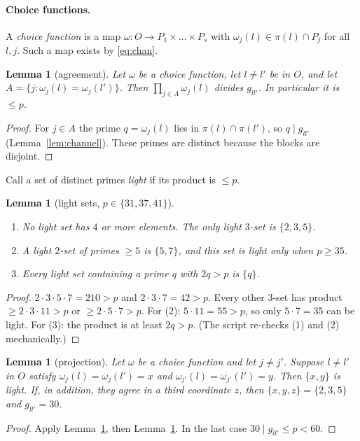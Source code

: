 \documentclass[11pt]{article}
\newtheorem{lemma}[theorem]{Lemma}
\theoremstyle{definition}
\theoremstyle{remark}
\begin{document}
\paragraph{Choice functions.} A \emph{choice function} is a map $\omega:O\to P_1\times\dots\times P_s$
with $\omega_j(l)\in\pi(l)\cap P_j$ for all $l,j$. Such a map exists by \eqref{eq:chan}.

\begin{lemma}[agreement]\label{lem:agree}
Let $\omega$ be a choice function, let $l\ne l'$ be in $O$, and let $A=\{j:\omega_j(l)=\omega_j(l')\}$.
Then $\prod_{j\in A}\omega_j(l)$ divides $g_{ll'}$. In particular it is $\le p$.
\end{lemma}
\begin{proof}
For $j\in A$ the prime $q=\omega_j(l)$ lies in $\pi(l)\cap\pi(l')$, so $q\mid g_{ll'}$
(Lemma~\ref{lem:channel}). These primes are distinct because the blocks are disjoint.
\end{proof}

Call a set of distinct primes \emph{light} if its product is $\le p$.

\begin{lemma}[light sets, $p\in\{31,37,41\}$]\label{lem:light}
\begin{enumerate}
\item No light set has $4$ or more elements. The only light $3$-set is $\{2,3,5\}$.
\item A light $2$-set of primes $\ge5$ is $\{5,7\}$, and this set is light only when $p\ge35$.
\item Every light set containing a prime $q$ with $2q>p$ is $\{q\}$.
\end{enumerate}
\end{lemma}
\begin{proof}
$2\cdot3\cdot5\cdot7=210>p$ and $2\cdot3\cdot7=42>p$. Every other $3$-set has product
$\ge2\cdot3\cdot11>p$ or $\ge2\cdot5\cdot7>p$. For (2): $5\cdot11=55>p$, so only
$5\cdot7=35$ can be light. For (3): the product is at least $2q>p$. (The script re-checks (1)
and (2) mechanically.)
\end{proof}

\begin{lemma}[projection]\label{lem:proj}
Let $\omega$ be a choice function and let $j\ne j'$. Suppose $l\ne l'$ in $O$ satisfy
$\omega_j(l)=\omega_j(l')=x$ and $\omega_{j'}(l)=\omega_{j'}(l')=y$. Then $\{x,y\}$ is light. If,
in addition, they agree in a third coordinate $z$, then $\{x,y,z\}=\{2,3,5\}$ and
$g_{ll'}=30$.
\end{lemma}
\begin{proof}
Apply Lemma~\ref{lem:agree}, then Lemma~\ref{lem:light}. In the last case $30\mid g_{ll'}\le p<60$.
\end{proof}
\end{document}
